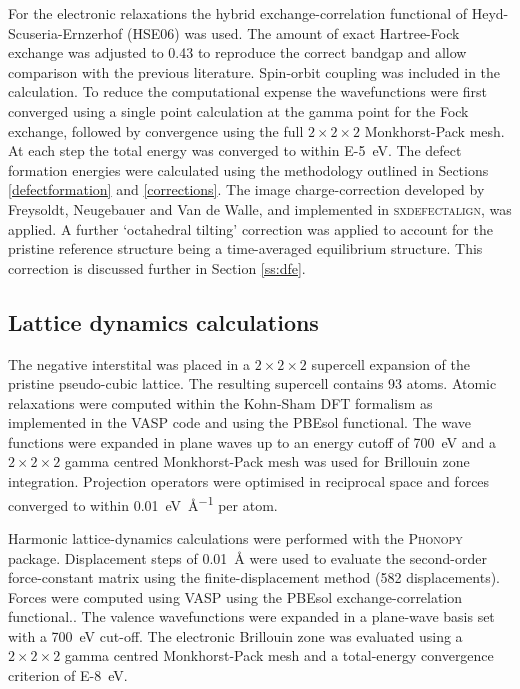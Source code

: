 For the electronic relaxations the hybrid exchange-correlation functional of Heyd-Scuseria-Ernzerhof (HSE06) was used.\autocite{Heyd2004a,Heyd2005a} The amount of exact Hartree-Fock exchange was adjusted to 0.43 to reproduce the correct bandgap and allow comparison with the previous literature.\autocite{Meggiolaro2018,Du2015} 
 Spin-orbit coupling was included in the calculation.
To reduce the computational expense the wavefunctions were first converged using a single point calculation at the gamma point for the Fock exchange, followed by convergence using the full $2\!\times\!2\!\times\!2$ Monkhorst-Pack mesh. At each step the total energy was converged to within \SI{E-5}{\electronvolt}.
The defect formation energies were calculated using the methodology outlined in Sections \ref{defectformation} and \ref{corrections}. The image charge-correction developed by Freysoldt, Neugebauer and Van de Walle, and implemented in \textsc{sxdefectalign},\autocite{sxdefectalign} was applied. A further `octahedral tilting' correction was applied to account for the pristine reference structure being a time-averaged equilibrium structure. This correction is discussed further in Section \ref{ss:dfe}.


\subsection{Lattice dynamics calculations}

The negative interstital was placed in a $2\!\times\!2\!\times\!2$ supercell expansion of the pristine pseudo-cubic lattice. The resulting supercell contains 93 atoms. Atomic relaxations were computed within the Kohn-Sham DFT formalism as implemented in the \textsc{VASP} code\autocite{Kresse1996a} and using the PBEsol functional. The wave functions were expanded in plane waves up to an energy cutoff of \SI{700}{\electronvolt} and a $2\! \times\! 2\! \times\! 2$ gamma centred Monkhorst-Pack mesh was used for Brillouin zone integration.  Projection operators were optimised in reciprocal space and forces converged to within \SI{0.01}{\electronvolt\per\angstrom} per atom.

Harmonic lattice-dynamics calculations were performed with the \textsc{Phonopy} package.\autocite{Togo2015} Displacement steps of \SI{0.01}{\angstrom} were used to evaluate the second-order force-constant matrix using the finite-displacement method (582 displacements).
Forces were computed using \textsc{VASP} using the PBEsol exchange-correlation functional.\autocite{Perdew2008a}.
The valence wavefunctions were expanded in a plane-wave basis set with a \SI{700}{\electronvolt} cut-off. The electronic Brillouin zone was evaluated using a $2\!\times\!2\!\times\!2$ gamma centred Monkhorst-Pack mesh and a total-energy convergence criterion of \SI{E-8}{\electronvolt}.

